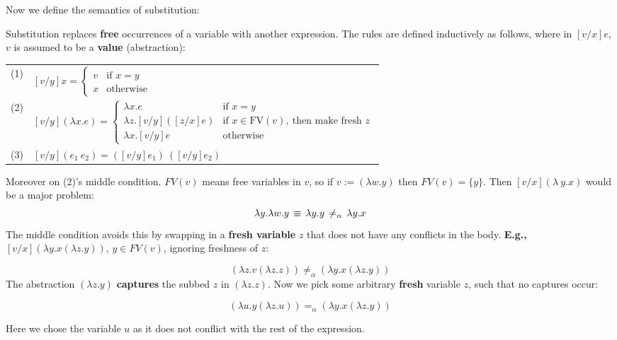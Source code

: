 \noindent
Now we define the semantics of substitution:
\begin{Def}

    \label{def:substitution}
    
    Substitution replaces \textbf{free} occurrences of a variable with another expression. The rules are defined inductively as follows, where in $[v/x]e$, $v$ is assumed to be a \textbf{value} (abstraction):
    
    \begin{center}
        \begin{tabular}{@{}l@{\quad}l@{}}
        (1) & \hspace{2em}
        $[v/y]x = 
        \begin{cases}
        v & \text{if } x = y \\
        x & \text{otherwise}
        \end{cases}$ \\[1em]
        
        (2) & \hspace{0em}
        $[v/y](\lambda x. e) = 
        \begin{cases}
        \lambda x. e & \text{if } x = y \\
        \lambda z. [v/y]([z/x]e) & \text{if } x \in \text{FV}(v),\ \text{then make fresh } z \\
        \lambda x. [v/y]e & \text{otherwise}
        \end{cases}$ \\[1em]
        
        (3) & \hspace{-.2em}
        $[v/y](e_1\ e_2) = ([v/y]e_1)\ ([v/y]e_2)$
        \end{tabular}
    \end{center}
    
    \noindent
    Moreover on (2)'s middle condition.
    $FV(v)$ means free variables in $v$,
    so if $v:=(\lambda w.y)$ then $FV(v)=\{y\}$.
    Then $[v/x](\lambda\ y.x)$ would be a major problem:
    \LARGE
    $$\Large \lambda y.\lambda w.y \,\equiv \, \lambda y.y \,\neq_\alpha\, \lambda y.x$$
    \normalsize
    The middle condition avoids
    this by swapping in a \textbf{fresh variable} $z$ that does not have any
    conflicts in the body. \textbf{E.g.,} $[v/x](\lambda y.x(\lambda z.y)) $, $y\in FV(v)$, ignoring freshness of $z$:
    
    \vspace{-1em}
    \LARGE
    $$ (\lambda z.v(\lambda z.z)) \neq_\alpha (\lambda y.x(\lambda z.y))$$
    \normalsize
    The abstraction $(\lambda z.y)$ \textbf{captures} the subbed $z$ in $(\lambda z.z)$. Now we pick some arbitrary \textbf{fresh} variable $z$, such 
    that no captures occur:

    \vspace{-1em}
    \LARGE
    $$ (\lambda u.y(\lambda z.u)) =_\alpha (\lambda y.x(\lambda z.y))$$
    \normalsize

    \noindent
    Here we chose the variable $u$ as it does not conflict with the rest of the expression.
\end{Def}

